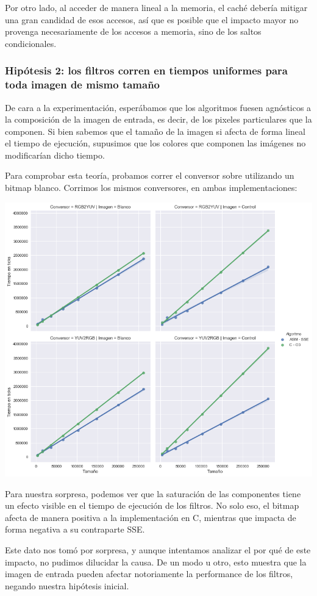 Por otro lado, al acceder de manera lineal a la memoria, el caché debería mitigar una gran candidad de esos accesos, así que es posible que el impacto mayor no provenga necesariamente de los accesos a memoria, sino de los saltos condicionales.

\subsubsection*{Hipótesis 2: los filtros corren en tiempos uniformes para toda imagen de mismo tamaño}

De cara a la experimentación, esperábamos que los algoritmos fuesen agnósticos a la composición de la imagen de entrada, es decir, de los pixeles particulares que la componen. Si bien sabemos que el tamaño de la imagen si afecta de forma lineal el tiempo de ejecución, supusimos que los colores que componen las imágenes no modificarían dicho tiempo.

Para comprobar esta teoría, probamos correr el conversor sobre utilizando un bitmap blanco. Corrimos los mismos conversores, en ambas implementaciones:

\begin{center}
	\includegraphics[scale=0.5]{img/conversores_blanco.png}
\end{center}

Para nuestra sorpresa, podemos ver que la saturación de las componentes tiene un efecto visible en el tiempo de ejecución de los filtros. No solo eso, el bitmap afecta de manera positiva a la implementación en C, mientras que impacta de forma negativa a su contraparte SSE.

Este dato nos tomó por sorpresa, y aunque intentamos analizar el por qué de este impacto, no pudimos dilucidar la causa. De un modo u otro, esto muestra que la imagen de entrada pueden afectar notoriamente la performance de los filtros, negando nuestra hipótesis inicial.